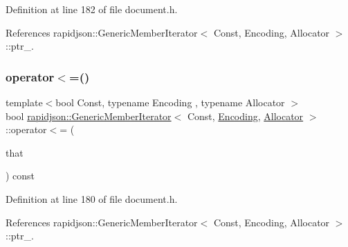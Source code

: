 Definition at line 182 of file document.\+h.


\begin{DoxyCode}{0}

\end{DoxyCode}


References rapidjson\+::\+Generic\+Member\+Iterator$<$ Const, Encoding, Allocator $>$\+::ptr\+\_\+.

\mbox{\label{classrapidjson_1_1_generic_member_iterator_a8defc2832dfffde7e7e8cab99233f16f}} 
\subsubsection{\texorpdfstring{operator$<$=()}{operator<=()}}
{\footnotesize\ttfamily template$<$bool Const, typename Encoding , typename Allocator $>$ \\
bool \mbox{\hyperlink{classrapidjson_1_1_generic_member_iterator}{rapidjson\+::\+Generic\+Member\+Iterator}}$<$ Const, \mbox{\hyperlink{classrapidjson_1_1_encoding}{Encoding}}, \mbox{\hyperlink{classrapidjson_1_1_allocator}{Allocator}} $>$\+::operator$<$= (\begin{DoxyParamCaption}\item[{\mbox{\hyperlink{classrapidjson_1_1_generic_member_iterator_a61b9a9ba8a5917d90406532f104605cc}{Const\+Iterator}}}]{that }\end{DoxyParamCaption}) const}



Definition at line 180 of file document.\+h.


\begin{DoxyCode}{0}

\end{DoxyCode}


References rapidjson\+::\+Generic\+Member\+Iterator$<$ Const, Encoding, Allocator $>$\+::ptr\+\_\+.

